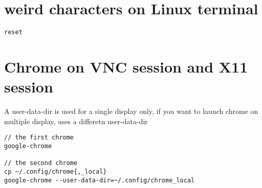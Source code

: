 \section{weird characters on Linux terminal}


\begin{verbatim}
reset
\end{verbatim}



\section{Chrome on VNC session and X11 session}


A user-data-dir is used for a single display only, if you want to launch chrome
on multiple display, uses a differetn user-data-dir

\begin{verbatim}
// the first chrome
google-chrome

// the second chrome
cp ~/.config/chrome{,_local}
google-chrome --user-data-dir=~/.config/chrome_local
\end{verbatim}
